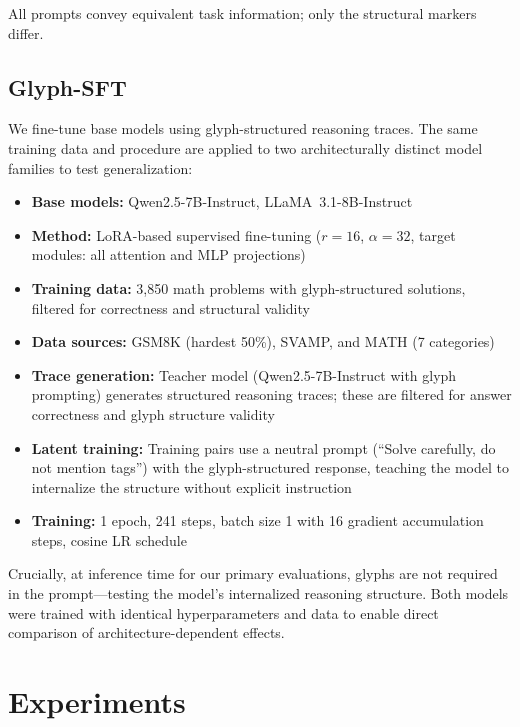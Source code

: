 \documentclass[11pt]{article}
\begin{document}
All prompts convey equivalent task information; only the structural markers differ.

\subsection{Glyph-SFT}

We fine-tune base models using glyph-structured reasoning traces. The same training data and procedure are applied to two architecturally distinct model families to test generalization:

\begin{itemize}
    \item \textbf{Base models:} Qwen2.5-7B-Instruct, LLaMA~3.1-8B-Instruct
    \item \textbf{Method:} LoRA-based supervised fine-tuning ($r{=}16$, $\alpha{=}32$, target modules: all attention and MLP projections)
    \item \textbf{Training data:} 3{,}850 math problems with glyph-structured solutions, filtered for correctness and structural validity
    \item \textbf{Data sources:} GSM8K (hardest 50\%), SVAMP, and MATH (7 categories)
    \item \textbf{Trace generation:} Teacher model (Qwen2.5-7B-Instruct with glyph prompting) generates structured reasoning traces; these are filtered for answer correctness and glyph structure validity
    \item \textbf{Latent training:} Training pairs use a neutral prompt (``Solve carefully, do not mention tags'') with the glyph-structured response, teaching the model to internalize the structure without explicit instruction
    \item \textbf{Training:} 1 epoch, 241 steps, batch size 1 with 16 gradient accumulation steps, cosine LR schedule
\end{itemize}

Crucially, at inference time for our primary evaluations, glyphs are not required in the prompt---testing the model's internalized reasoning structure. Both models were trained with identical hyperparameters and data to enable direct comparison of architecture-dependent effects.

\section{Experiments}
\end{document}
